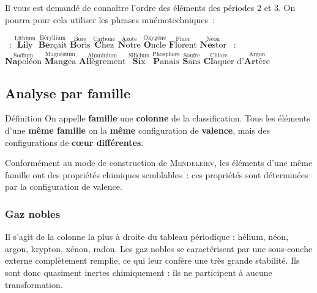 \documentclass[../main/main.tex]{subfiles}
\begin{document}
Il vous est demandé de connaître l'ordre des éléments des périodes 2 et 3. On
pourra pour cela utiliser les phrases mnémotechniques~:
\begin{itemize}
    ~:
        $\overset{\text{Lithium}}{\textbf{Li}\text{ly}}
        \,\,
        \overset{\text{Béryllium}}{\textbf{Be}\text{rçait}}
        \,\,
        \overset{\text{Bore}}{\textbf{B}\text{oris}}
        \,\,
        \overset{\text{Carbone}}{\textbf{C}\text{hez}}
        \,\,
        \overset{\text{Azote}}{\textbf{N}\text{otre}}
        \,\,
        \overset{\text{Oxygène}}{\textbf{O}\text{ncle}}
        \,\,
        \overset{\text{Fluor}}{\textbf{F}\text{lorent}}
        \,\,
        \overset{\text{Néon}}{\textbf{Ne}\text{stor}}$
    ~:
        $\overset{\text{Sodium}}{\textbf{Na}\text{poléon}}
        \,\,
        \overset{\text{Magnésium}}{\textbf{M}\text{an}\textbf{g}\text{ea}}
        \,\,
        \overset{\text{Aluminium}}{\textbf{Al}\text{lègrement}}
        \,\,
        \overset{\text{Silicium}}{\textbf{Si}\text{x}}
        \,\,
        \overset{\text{Phosphore}}{\textbf{P}\text{anais}}
        \,\,
        \overset{\text{Soufre}}{\textbf{S}\text{ans}}
        \,\,
        \overset{\text{Chlore}}{\textbf{Cl}\text{aquer}}
        \,\,
        \text{d'}
        \overset{\text{Argon}}{\textbf{Ar}\text{tère}}$
\end{itemize}



\subsection{Analyse par famille}
\begin{tdefi}{Définition}
    On appelle \textbf{famille} une \textbf{colonne} de la classification. Tous
    les éléments d'une \textbf{même famille} on la \textbf{même} configuration
    de \textbf{valence}, mais des configurations de \textbf{cœur différentes}.
\end{tdefi}
Conformément au mode de construction de \textsc{Mendeleïev,} les éléments d'une même
famille ont des propriétés chimiques semblables~: ces propriétés sont
déterminées par la configuration de valence.

\subsubsection{Gaz nobles}
Il s'agit de la colonne la plus à droite du tableau périodique : hélium, néon,
argon, krypton, xénon, radon. Les gaz nobles se caractérisent par une
sous-couche externe complètement remplie, ce qui leur confère une très grande
stabilité. Ils sont donc quasiment inertes chimiquement : ils ne participent à
aucune transformation. \bigbreak
\end{document}
